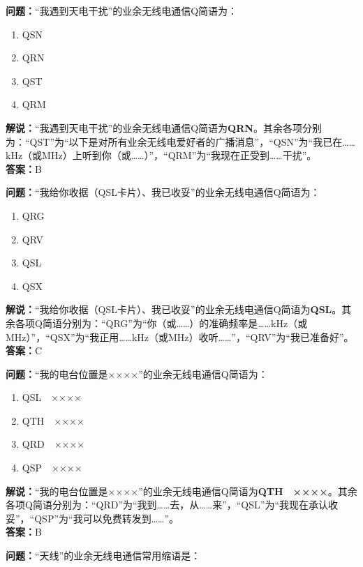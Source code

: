 \textbf{问题：}“我遇到天电干扰”的业余无线电通信Q简语为：

\begin{enumerate}[label=\Alph*), leftmargin=1.5cm]
	\item QSN
	\item QRN
	\item QST
	\item QRM
\end{enumerate}

\textbf{解说：}“我遇到天电干扰”的业余无线电通信Q简语为\textbf{QRN}。其余各项分别为：“QST”为“以下是对所有业余无线电爱好者的广播消息”，“QSN”为“我已在……kHz（或MHz）上听到你（或……）”，“QRM”为“我现在正受到……干扰”。\\\textbf{答案：}B



\textbf{问题：}“我给你收据（QSL卡片）、我已收妥”的业余无线电通信Q简语为：

\begin{enumerate}[label=\Alph*), leftmargin=1.5cm]
	\item QRG
	\item QRV
	\item QSL
	\item QSX
\end{enumerate}

\textbf{解说：}“我给你收据（QSL卡片）、我已收妥”的业余无线电通信Q简语为\textbf{QSL}。其余各项Q简语分别为：“QRG”为“你（或……）的准确频率是……kHz（或MHz）”，“QSX”为“我正用……kHz（或MHz）收听……”，“QRV”为“我已准备好”。\\\textbf{答案：}C



\textbf{问题：}“我的电台位置是××××”的业余无线电通信Q简语为：

\begin{enumerate}[label=\Alph*), leftmargin=1.5cm]
	\item QSL　××××
	\item QTH　××××
	\item QRD　××××
	\item QSP　××××
\end{enumerate}

\textbf{解说：}“我的电台位置是××××”的业余无线电通信Q简语为\textbf{QTH　××××}。其余各项Q简语分别为：“QRD”为“我到……去，从……来”，“QSL”为“我现在承认收妥”，“QSP”为“我可以免费转发到……”。\\\textbf{答案：}B



\textbf{问题：}“天线”的业余无线电通信常用缩语是：

